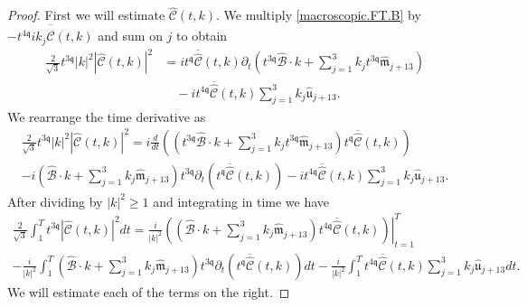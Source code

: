 \documentclass[10pt,a4paper]{amsart}
\newcommand{\qq}{\mathfrak{q}}
\newcommand{\tTq}{t^{3\qq}}
\newcommand{\tq}{t^{\qq}}
\begin{document}
\begin{proof}
 

First we will estimate $\widehat{\mathcal{C}}(t,k)$. We multiply \eqref{macroscopic.FT.B} by $-t^{4\qq} ik_j  \overline{\widehat{\mathcal{C}}}(t,k)$ and sum on $j$ to obtain
\begin{align*}
 \frac{2}{\sqrt{3}}\tTq |k|^2   \left|\widehat{\mathcal{C}}(t,k)\right|^2
& =   i \tq\overline{\widehat{\mathcal{C}}}(t,k)\partial_t \left(\tTq \widehat{\mathcal{B}}\cdot k +\sum_{j=1}^3 k_j   \tTq \widehat{\mathfrak{m}}_{j+13} \right)
\\
& \quad -
i t^{4\qq}\overline{\widehat{\mathcal{C}}}(t,k)  \sum_{j=1}^3 k_j\hat{\mathfrak{u}}_{j+13} .
\end{align*}
We rearrange the time derivative as
\begin{multline*}
 \frac{2}{\sqrt{3}}\tTq |k|^2   \left|\widehat{\mathcal{C}}(t,k)\right|^2
=   i \frac{d}{dt} \left( \left(\tTq \widehat{\mathcal{B}}\cdot k +\sum_{j=1}^3 k_j   \tTq \widehat{\mathfrak{m}}_{j+13} \right)\tq\overline{\widehat{\mathcal{C}}}(t,k) \right)
\\
-
i  \left( \widehat{\mathcal{B}}\cdot k +\sum_{j=1}^3 k_j    \widehat{\mathfrak{m}}_{j+13} \right) \tTq\partial_t  \left(\tq\overline{\widehat{\mathcal{C}}}(t,k)\right)
-
i t^{4\qq}\overline{\widehat{\mathcal{C}}}(t,k)  \sum_{j=1}^3 k_j\hat{\mathfrak{u}}_{j+13} .
\end{multline*}
After dividing by $|k|^2 \ge 1$ and integrating in time we have
\begin{multline*}
 \frac{2}{\sqrt{3}}\int_1^{T} \tTq|\widehat{\mathcal{C}}(t,k)|^2  dt
=
\left. \frac{i}{|k|^2} \left( \left( \widehat{\mathcal{B}}\cdot k +\sum_{j=1}^3 k_j    \widehat{\mathfrak{m}}_{j+13} \right)t^{4\qq}\overline{\widehat{\mathcal{C}}}(t,k) \right)\right|_{t=1}^T
\\
-
\frac{i}{|k|^2} \int_1^{T} \left( \widehat{\mathcal{B}}\cdot k +\sum_{j=1}^3 k_j    \widehat{\mathfrak{m}}_{j+13} \right) \tTq\partial_t  \left(\tq\overline{\widehat{\mathcal{C}}}(t,k)\right) dt
-
\frac{i}{|k|^2} \int_1^{T}t^{4\qq}\overline{\widehat{\mathcal{C}}}(t,k)  \sum_{j=1}^3 k_j\hat{\mathfrak{u}}_{j+13} dt.
\end{multline*}
We will estimate each of the terms on the right.  




\end{proof}
\end{document}
